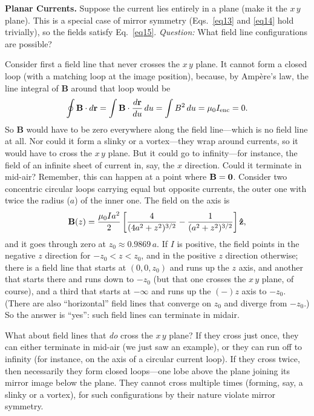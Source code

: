 \documentclass[aps,prb,twocolumn,groupedaddress,noshowpacs,checklength,amsmath]{revtex4-1}
\def\zhat{{\bf \hat z}}
\begin{document}
{\bf Planar Currents.}  Suppose the current lies entirely in a plane (make it the $x\,y$ plane).  This is a special case of mirror symmetry (Eqs.~\ref{eq13} and \ref{eq14} hold trivially), so the fields satisfy Eq.~\ref{eq15}.  {\it Question:}  What field line configurations are possible?

Consider first a field line that never crosses the $x\,y$ plane.  It cannot form a closed loop (with a matching loop at the image position), because, by Amp\`ere's law, the line integral of {\bf B} around that loop would be 
\begin{equation}
\oint {\bf B}\cdot d{\bf r} = \int {\bf B} \cdot \frac{d{\bf r}}{du}\,du = \int B^2\,du = \mu_0I_{\rm enc} = 0.\label{eq16}
\end{equation}
So {\bf B} would have to be zero everywhere along the field line---which is no field line at all.  Nor could it form a slinky or a vortex---they wrap around currents, so it would have to cross the $x\,y$ plane.  But it could go to infinity---for instance, the field of an infinite sheet of current in, say, the $x$ direction.  Could it terminate in mid-air?  Remember, this can happen at a point where ${\bf B}={\bf 0}$.  Consider two concentric circular loops carrying equal but opposite currents, the outer one with twice the radius ($a$) of the inner one.  The field on the axis is
\begin{equation}
{\bf B}(z) = \frac{\mu_0Ia^2}{2}\left[\frac{4}{(4a^2+z^2)^{3/2}}-\frac{1}{(a^2+z^2)^{3/2}}\right]\zhat,\label{eq17}
\end{equation}
and it  goes through zero at $z_0 \approx  0.9869\,a$.  If $I$ is positive, the field points in the negative $z$ direction for $-z_0 < z < z_0$, and in the positive $z$ direction otherwise; there is a field line that starts at $(0,0,z_0)$ and runs up the $z$ axis, and another that starts there and runs down to $-z_0$ (but that one crosses the $x\,y$ plane, of course), and a third that starts at $-\infty$ and runs up the $(-)z$ axis to $-z_0$.  (There are also ``horizontal'' field lines that converge on $z_0$ and diverge from $-z_0$.)  So the answer is ``yes'': such field lines can terminate in midair.

What about field lines that {\it do} cross the $x\,y$ plane?  If they cross just once, they can either terminate in mid-air (we just saw an example), or they can run off to infinity (for instance, on the axis of a circular current loop).  If they cross twice, then necessarily they form closed loops---one lobe above the plane joining its mirror image below the plane.  They cannot cross multiple times (forming, say, a slinky or a vortex), for such configurations by their nature violate mirror symmetry.  
\end{document}
